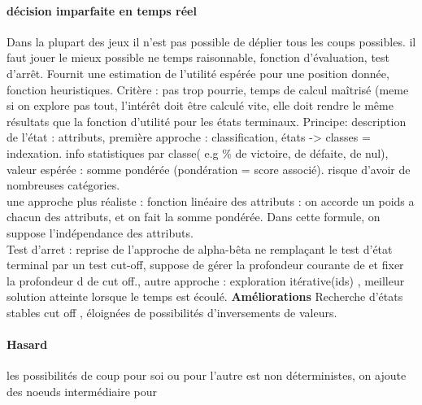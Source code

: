 \documentclass{article}
\begin{document}
\paragraph{décision imparfaite en temps réel} Dans la plupart des jeux il n'est pas possible de déplier tous les coups possibles. il faut jouer le mieux possible ne temps raisonnable, fonction d'évaluation, test d’arrêt. Fournit une estimation de l'utilité espérée pour une position donnée, fonction heuristiques. Critère : pas trop pourrie, temps de calcul maîtrisé (meme si on explore pas tout, l’intérêt doit être calculé vite, elle doit rendre le même résultats que la fonction d'utilité pour les états terminaux. Principe: description de l'état : attributs, première approche : classification, états -> classes = indexation. info statistiques par classe( e.g  \% de victoire, de défaite, de nul), valeur espérée : somme pondérée (pondération = score associé). risque d'avoir de nombreuses catégories. \\ une approche plus réaliste  : fonction linéaire des attributs : on accorde un poids a chacun des attributs, et on fait la somme pondérée. Dans cette formule, on suppose l’indépendance des attributs.\\ Test d'arret : reprise de l'approche de alpha-bêta ne remplaçant le test d'état terminal par un test cut-off, suppose de gérer la profondeur courante de et fixer la profondeur d de cut off., autre approche : exploration itérative(ids) , meilleur solution atteinte lorsque le temps est écoulé. \textbf{Améliorations} Recherche d'états stables cut off , éloignées de possibilités d'inversements de valeurs.

\paragraph{Hasard} les possibilités de coup pour soi ou pour l'autre est non déterministes, on ajoute des noeuds intermédiaire pour 
\end{document}
